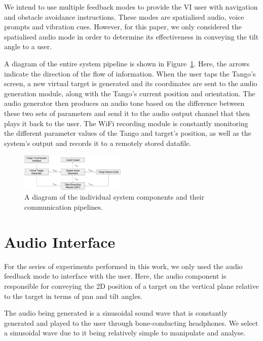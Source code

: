 \documentclass[format=sigconf, review=true, screen=true, anonymous=true]{acmart}
\begin{document}
We intend to use multiple feedback modes to provide the VI user with navigation and obstacle avoidance instructions. These modes are spatialised audio, voice prompts and vibration cues. However, for this paper, we only considered the spatialised audio mode in order to determine its effectiveness in conveying the tilt angle to a user.

A diagram of the entire system pipeline is shown in Figure~\ref{fig:pipeline}. Here, the arrows indicate the direction of the flow of information. When the user taps the Tango's screen, a new virtual target is generated and its coordinates are sent to the audio generation module, along with the Tango's current position and orientation. The audio generator then produces an audio tone based on the difference between these two sets of parameters and send it to the audio output channel that then plays it back to the user. The WiFi recording module is constantly monitoring the different parameter values of the Tango and target's position, as well as the system's output and records it to a remotely stored datafile. 

\begin{figure}
  \centering
  \includegraphics[width=0.45\textwidth]{figures/pipeline.pdf}
  \caption{A diagram of the individual system components and their communication pipelines. }
  \label{fig:pipeline}
\end{figure}

\section{Audio Interface}
\label{sec:interface}

For the series of experiments performed in this work, we only used the audio feedback mode to interface with the user. Here, the audio component is responsible for conveying the 2D position of a target on the vertical plane relative to the target in terms of pan and tilt angles. 

The audio being generated is a sinusoidal sound wave that is constantly generated and played to the user through bone-conducting headphones. We select a sinusoidal wave due to it being relatively simple to manipulate and analyse. %
\end{document}
